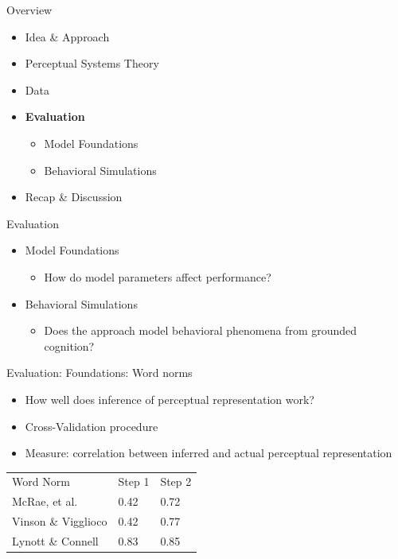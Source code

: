 \documentclass[12pt,a4paper]{beamer}
\begin{document}
\begin{frame}{Overview}
\begin{itemize}
\item Idea \& Approach 
\item Perceptual Systems Theory
\item Data
\item \textbf{Evaluation}
    \begin{itemize}
    \item Model Foundations
    \item Behavioral Simulations
    \end{itemize}
\item Recap \& Discussion
\end{itemize}
\end{frame}




\begin{frame}{Evaluation}
\begin{itemize}
    \item Model Foundations
        \begin{itemize}
        \item How do model parameters affect performance?
        \end{itemize}
    \item Behavioral Simulations
        \begin{itemize}
        \item Does the approach model behavioral phenomena from grounded cognition?
        \end{itemize}
\end{itemize}
\end{frame}

\begin{frame}{Evaluation: Foundations: Word norms}
\begin{itemize}
\item How well does inference of perceptual representation work?
\item Cross-Validation procedure
\item Measure: correlation between inferred and actual perceptual representation
\end{itemize}
\begin{table}
    \begin{tabular}{lll}
    Word Norm          & Step 1 & Step 2 \\
    McRae, et al.      & 0.42   & 0.72   \\
    Vinson \& Vigglioco & 0.42   & 0.77   \\
    Lynott \& Connell   & 0.83   & 0.85   \\
    \end{tabular}
\end{table}
\end{frame}
\end{document}
